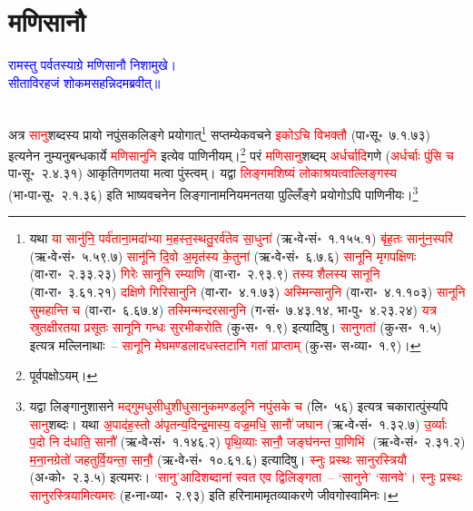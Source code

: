 \section[मणिसानौ]{मणिसानौ}
\centering\textcolor{blue}{रामस्तु पर्वतस्याग्रे मणिसानौ निशामुखे।\nopagebreak\\
सीताविरहजं शोकमसहन्निदमब्रवीत्॥}\nopagebreak\\
\\
\begin{sloppypar}\justifying\noindent\hspace{10mm} अत्र \textcolor{red}{सानु}\-शब्दस्य प्रायो नपुंसक\-लिङ्गे प्रयोगात्\footnote{यथा \textcolor{red}{या सानु॑नि॒ पर्व॑ताना॒मदा॑भ्या म॒हस्त॒स्थतु॒रर्व॑तेव सा॒धुना॑} (ऋ॰वे॰सं॰~१.१५५.१) \textcolor{red}{बृ॑ह॒तः सानु॑न॒स्परि॑} (ऋ॰वे॰सं॰~५.५९.७) \textcolor{red}{सानू॑नि दि॒वो अ॒मृत॑स्य के॒तुना॑} (ऋ॰वे॰सं॰~६.७.६) \textcolor{red}{सानूनि मृगपक्षिणः} (वा॰रा॰~२.३३.२३) \textcolor{red}{गिरेः सानूनि रम्याणि} (वा॰रा॰~२.९३.९) \textcolor{red}{तस्य शैलस्य सानूनि} (वा॰रा॰~३.६१.२१) \textcolor{red}{दक्षिणे गिरिसानुनि} (वा॰रा॰~४.१.७३) \textcolor{red}{अस्मिन्सानुनि} (वा॰रा॰~४.१.१०३) \textcolor{red}{सानूनि सुमहान्ति च} (वा॰रा॰~६.६७.४) \textcolor{red}{तस्मिन्मन्दरसानुनि} (ग॰सं॰~७.४३.१४, भा॰पु॰~४.२३.२४) \textcolor{red}{यत्र स्रुतक्षीरतया प्रसूतः सानूनि गन्धः सुरभीकरोति} (कु॰स॰~१.९) इत्यादिषु। \textcolor{red}{सानुगतां} (कु॰स॰~१.५) इत्यत्र मल्लिनाथाः~– \textcolor{red}{सानूनि मेघमण्डलादधस्तटानि गतां प्राप्ताम्} (कु॰स॰ स॰व्या॰~१.९)।} सप्तम्येकवचने \textcolor{red}{इकोऽचि विभक्तौ} (पा॰सू॰~७.१.७३) इत्यनेन नुम्यनुबन्ध\-कार्ये \textcolor{red}{मणि\-सानुनि} इत्येव पाणिनीयम्।\footnote{पूर्वपक्षोऽयम्।} परं \textcolor{red}{मणि\-सानु}\-शब्दम् \textcolor{red}{अर्धर्चादि}\-गणे (\textcolor{red}{अर्धर्चाः पुंसि च} पा॰सू॰~२.४.३१) आकृति\-गणतया मत्वा पुंस्त्वम्। यद्वा \textcolor{red}{लिङ्गमशिष्यं लोकाश्रयत्वाल्लिङ्गस्य} (भा॰पा॰सू॰~२.१.३६) इति भाष्य\-वचनेन लिङ्गानामनियमनतया पुल्लिँङ्गे प्रयोगोऽपि पाणिनीयः।\footnote{यद्वा लिङ्गानुशासने \textcolor{red}{मद्गु\-मधु\-सीधु\-शीधु\-सानु\-कमण्डलूनि नपुंसके च} (लि॰~५६) इत्यत्र चकारात्पुंस्यपि \textcolor{red}{सानु}\-शब्दः।  यथा \textcolor{red}{अ॒पाद॑ह॒स्तो अ॑पृतन्य॒दिन्द्र॒मास्य॒ वज्र॒मधि॒ सानौ॑ जघान} (ऋ॰वे॰सं॰~१.३२.७) \textcolor{red}{उ॒र्व्याः प॒दो नि द॑धाति॒ सानौ॑} (ऋ॰वे॰सं॰~१.१४६.२) \textcolor{red}{पृथि॒व्याः सानौ॒ जङ्घ॑नन्त पा॒णिभि॑} (ऋ॰वे॰सं॰~२.३१.२) \textcolor{red}{म॒ना॒नग्रेतो॑ जहतुर्वि॒यन्ता॒ सानौ॒} (ऋ॰वे॰सं॰~१०.६१.६) इत्यादिषु। \textcolor{red}{स्नुः प्रस्थः सानुरस्त्रियौ} (अ॰को॰~२.३.५) इत्यमरः। \textcolor{red}{‘सानु’आदि\-शब्दानां स्वत एव द्विलिङ्गता~– ‘सानुने’ ‘सानवे’। स्नुः प्रस्थः सानुरस्त्रियामित्यमरः} (ह॰ना॰व्या॰~२.९३) इति हरिनामामृत\-व्याकरणे जीवगोस्वामिनः।}\end{sloppypar}
